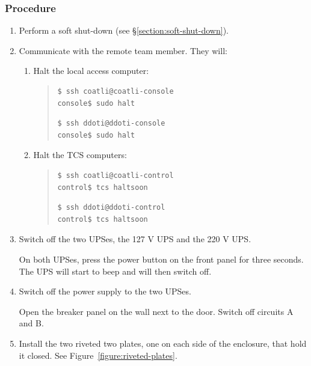 \subsubsection{Procedure}

\begin{enumerate}
\item Perform a soft shut-down (see \S\ref{section:soft-shut-down}).
\item Communicate with the remote team member. They will:
\begin{enumerate}

    \item Halt the local access computer:

\begin{quote}\footnotesize
\ifcoatli
\begin{verbatim}
$ ssh coatli@coatli-console
console$ sudo halt
\end{verbatim}
\fi
\ifddoti
\begin{verbatim}
$ ssh ddoti@ddoti-console
console$ sudo halt
\end{verbatim}
\fi
\end{quote}
    
    \item Halt the TCS computers:

\begin{quote}\footnotesize
\ifcoatli
\begin{verbatim}
$ ssh coatli@coatli-control
control$ tcs haltsoon
\end{verbatim}
\fi
\ifddoti
\begin{verbatim}
$ ssh ddoti@ddoti-control
control$ tcs haltsoon
\end{verbatim}
\fi
\end{quote}

\end{enumerate}

\item Switch off the two UPSes, the 127 V UPS and the 220 V UPS.

On both UPSes, press the power button on the front panel for three seconds. The UPS will start to beep and will then switch off.

\item Switch off the power supply to the two UPSes.

Open the breaker panel on the wall next to the door. Switch off circuits A and B.

\item
Install the two riveted two plates, one on each side of the enclosure, that hold it closed. See Figure~\ref{figure:riveted-plates}.


\end{enumerate}
